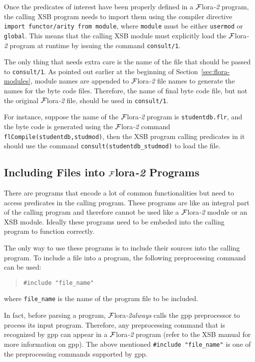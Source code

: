 \documentclass[11pt]{article}
\newcommand{\FLORA}{{\mbox{${\cal F}${\sc lora}\rm\emph{-2}}}\xspace}
\begin{document}
Once the predicates of interest have been properly defined in a \FLORA
program, the calling XSB program needs to import them using the
compiler directive \mbox{\tt import functor/arity from module}, where
{\tt module} must be either {\tt usermod} or {\tt global}. This means
that the calling XSB module must explicitly load the \FLORA program 
at runtime by issuing the command {\tt consult/1}.

%
The only thing that needs extra care is the name of the file that
should be passed to \mbox{\tt consult/1}. As pointed out earlier at
the beginning of Section~\ref{sec:flora-modules}, module names are
appended to \FLORA file names to generate the names for the byte code
files. Therefore, the name of final byte code file, but not the
original \FLORA file, should be used in {\tt consult/1}.

For instance, suppose the name of the \FLORA program is
{\tt studentdb.flr}, and the byte code is generated using the \FLORA
command {\tt flCompile(studentdb,studmod)}, then the XSB program
calling predicates in it should use the command
\verb|consult(studentdb_studmod)| to load the file.


\subsection{Including Files into \FLORA Programs}


There are programs that encode a lot of common functionalities but
need to access predicates in the calling program. These programs are
like an integral part of the calling program and therefore cannot be
used like a \FLORA module or an XSB module. Ideally these programs
need to be embeded into the calling program to function correctly.

%
The only way to use these programs is to include their sources into
the calling program. To include a file into a program, the following
preprocessing command can be used:
\begin{quote}
\verb|#include "file_name"|
\end{quote}
where \verb|file_name| is the name of the program file to be included.

In fact, before parsing a program, \FLORA \emph{always} calls the
{\sf gpp} preprocessor to process its input program. Therefore, any
preprocessing command that is recognized by {\sf gpp} can appear in
a \FLORA program (refer to the XSB manual for more information on
{\sf gpp}). The above mentioned \verb|#include "file_name"| is one
of the preprocessing commands supported by {\sf gpp}.
\end{document}
